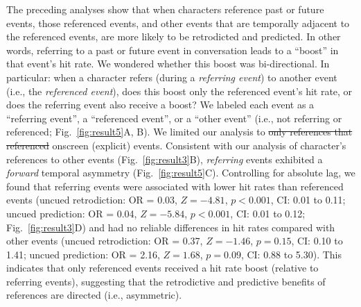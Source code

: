 \documentclass[10pt]{article}
\providecommand{\DIFaddtex}[1]{{\protect\color{blue}\uwave{#1}}} %
\providecommand{\DIFdeltex}[1]{{\protect\color{red}\sout{#1}}}                      %
\providecommand{\DIFaddbegin}{} %
\providecommand{\DIFaddend}{} %
\providecommand{\DIFdelbegin}{} %
\providecommand{\DIFdelend}{} %
\providecommand{\DIFadd}[1]{\texorpdfstring{\DIFaddtex{#1}}{#1}} %
\providecommand{\DIFdel}[1]{\texorpdfstring{\DIFdeltex{#1}}{}} %
\newcommand{\DIFscaledelfig}{0.5}
\newlength{\DIFdelgraphicswidth} %
\newlength{\DIFdelgraphicsheight} %
\newcommand{\DIFaddincludegraphics}[2][]{{\color{blue}\fbox{\DIFOincludegraphics[#1]{#2}}}} %
\newcommand{\DIFdelincludegraphics}[2][]{%
\sbox{\DIFdelgraphicsbox}{\DIFOincludegraphics[#1]{#2}}%
\settoboxwidth{\DIFdelgraphicswidth}{\DIFdelgraphicsbox} %
\settoboxtotalheight{\DIFdelgraphicsheight}{\DIFdelgraphicsbox} %
\scalebox{\DIFscaledelfig}{%
\parbox[b]{\DIFdelgraphicswidth}{\usebox{\DIFdelgraphicsbox}\\[-\baselineskip] \rule{\DIFdelgraphicswidth}{0em}}\llap{\resizebox{\DIFdelgraphicswidth}{\DIFdelgraphicsheight}{%
\setlength{\unitlength}{\DIFdelgraphicswidth}%
\begin{picture}(1,1)%
\thicklines\linethickness{2pt} %
{\color[rgb]{1,0,0}\put(0,0){\framebox(1,1){}}}%
{\color[rgb]{1,0,0}\put(0,0){\line( 1,1){1}}}%
{\color[rgb]{1,0,0}\put(0,1){\line(1,-1){1}}}%
\end{picture}%
}\hspace*{3pt}}} %
} %
\DeclareRobustCommand{\DIFaddbegin}{\DIFOaddbegin \let\includegraphics\DIFaddincludegraphics} %
\DeclareRobustCommand{\DIFaddend}{\DIFOaddend \let\includegraphics\DIFOincludegraphics} %
\DeclareRobustCommand{\DIFdelbegin}{\DIFOdelbegin \let\includegraphics\DIFdelincludegraphics} %
\DeclareRobustCommand{\DIFdelend}{\DIFOaddend \let\includegraphics\DIFOincludegraphics} %
\begin{document}
The preceding analyses show that when characters reference past or future events, those referenced events, and other events that are temporally adjacent to the referenced events, are more likely to be retrodicted and predicted.  In other words, referring to a past or future event in conversation leads to a ``boost'' in that event's hit rate.  We wondered whether this boost was bi-directional.  In particular: when a character refers (during a \textit{referring event}) to another event (i.e., the \textit{referenced event}), does this boost only the referenced event's hit rate, or does the referring event also receive a boost?  We labeled each event as a ``referring event'', a ``referenced event'', or a ``other event'' (i.e., not referring or referenced; Fig.~\ref{fig:result5}A, B).  We limited our analysis to \DIFdelbegin \DIFdel{only references that referenced }\DIFdelend \DIFaddbegin \DIFadd{references to }\DIFaddend onscreen (explicit) events.   Consistent with our analysis of character's references to other events (Fig.~\ref{fig:result3}B), \textit{referring} events exhibited a \textit{forward} temporal asymmetry (Fig.~\ref{fig:result5}C).  Controlling for absolute lag, we found that referring events were associated with lower hit rates than referenced events (uncued retrodiction: OR = 0.03, $Z = -4.81$, $p < 0.001$, CI: 0.01 to 0.11; uncued prediction: OR = 0.04, $Z = -5.84$, $p < 0.001$, CI: 0.01 to 0.12; Fig.~\ref{fig:result3}D) and had no reliable differences in hit rates compared with other events (uncued retrodiction: OR = 0.37, $Z = -1.46$, $p = 0.15$, CI: 0.10 to 1.41; uncued prediction: OR = 2.16, $Z = 1.68$, $p = 0.09$, CI: 0.88 to 5.30).  This indicates that only referenced events received a hit rate boost (relative to referring events), suggesting that the retrodictive and predictive benefits of references are directed (i.e., asymmetric).
\end{document}
